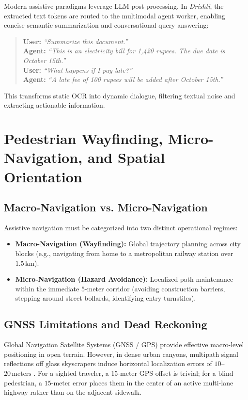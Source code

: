 \documentclass[10pt,twocolumn]{article}
\begin{document}
Modern assistive paradigms leverage LLM post-processing. In \textit{Drishti}, the extracted text tokens are routed to the multimodal agent worker, enabling concise semantic summarization and conversational query answering:
\begin{quote}
    \textbf{User:} \textit{``Summarize this document.''} \\
    \textbf{Agent:} \textit{``This is an electricity bill for 1,420 rupees. The due date is October 15th.''} \\
    \textbf{User:} \textit{``What happens if I pay late?''} \\
    \textbf{Agent:} \textit{``A late fee of 100 rupees will be added after October 15th.''}
\end{quote}
This transforms static OCR into dynamic dialogue, filtering textual noise and extracting actionable information.

\section{Pedestrian Wayfinding, Micro-Navigation, and Spatial Orientation}
\label{sec:navigation}

\subsection{Macro-Navigation vs. Micro-Navigation}
Assistive navigation must be categorized into two distinct operational regimes:
\begin{itemize}[leftmargin=*]
    \item \textbf{Macro-Navigation (Wayfinding):} Global trajectory planning across city blocks (e.g., navigating from home to a metropolitan railway station over $1.5\,\text{km}$).
    \item \textbf{Micro-Navigation (Hazard Avoidance):} Localized path maintenance within the immediate $5$-meter corridor (avoiding construction barriers, stepping around street bollards, identifying entry turnstiles).
\end{itemize}

\subsection{GNSS Limitations and Dead Reckoning}
Global Navigation Satellite Systems (GNSS / GPS) provide effective macro-level positioning in open terrain. However, in dense urban canyons, multipath signal reflections off glass skyscrapers induce horizontal localization errors of $10$--$20\,\text{meters}$ \cite{manduchi2012last}. For a sighted traveler, a $15$-meter GPS offset is trivial; for a blind pedestrian, a $15$-meter error places them in the center of an active multi-lane highway rather than on the adjacent sidewalk.
\end{document}
